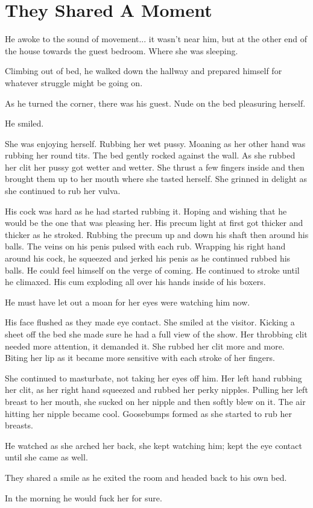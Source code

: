 

\section{They Shared A Moment}

He awoke to the sound of movement... it wasn't near him, but at the other end of the house towards the guest bedroom. Where she was sleeping.

Climbing out of bed, he walked down the hallway and prepared himself for whatever struggle might be going on.

As he turned the corner, there was his guest. Nude on the bed pleasuring herself.

He smiled.

She was enjoying herself. Rubbing her wet pussy. Moaning as her other hand was rubbing her round tits. The bed gently rocked against the wall. As she rubbed her clit her pussy got wetter and wetter. She thrust a few fingers inside and then brought them up to her mouth where she tasted herself. She grinned in delight as she continued to rub her vulva.

His cock was hard as he had started rubbing it. Hoping and wishing that he would be the one that was pleasing her. His precum light at first got thicker and thicker as he stroked. Rubbing the precum up and down his shaft then around his balls. The veins on his penis pulsed with each rub. Wrapping his right hand around his cock, he squeezed and jerked his penis as he continued rubbed his balls. He could feel himself on the verge of coming. He continued to stroke until he climaxed. His cum exploding all over his hands inside of his boxers.

He must have let out a moan for her eyes were watching him now.

His face flushed as they made eye contact. She smiled at the visitor. Kicking a sheet off the bed she made sure he had a full view of the show. Her throbbing clit needed more attention, it demanded it. She rubbed her clit more and more. Biting her lip as it became more sensitive with each stroke of her fingers.

She continued to masturbate, not taking her eyes off him. Her left hand rubbing her clit, as her right hand squeezed and rubbed her perky nipples. Pulling her left breast to her mouth, she sucked on her nipple and then softly blew on it. The air hitting her nipple became cool. Goosebumps formed as she started to rub her breasts.

He watched as she arched her back, she kept watching him; kept the eye contact until she came as well.

They shared a smile as he exited the room and headed back to his own bed.

In the morning he would fuck her for sure.

